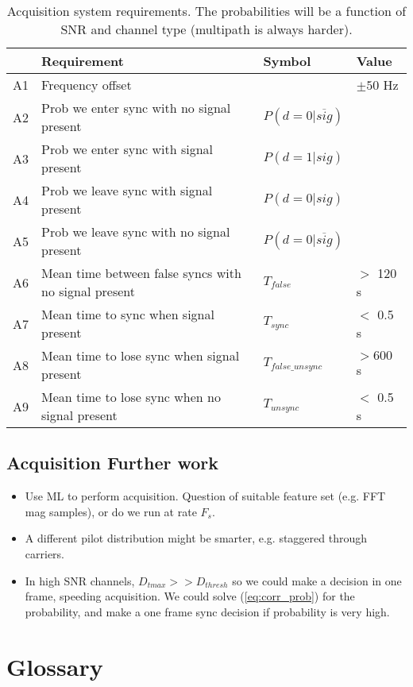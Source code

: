 \documentclass{article}
\begin{document}
\begin{table} [H]
\centering
\begin{tabular}{ m{0.3cm} | m{6.5cm} | m{2.1cm} | m{1.25cm}}
 \hline
  & Requirement & Symbol & Value \\
 \hline
  A1 & Frequency offset & & $\pm 50$ Hz \\
  A2 & Prob we enter sync with no signal present  & $P(d=0 | \overline{sig})$ & \\
  A3 & Prob we enter sync with signal present  & $P(d=1 | sig)$ &  \\
  A4 & Prob we leave sync with signal present  & $P(d=0 | sig)$ &  \\
  A5 & Prob we leave sync with no signal present  & $P(d=0 | \overline{sig})$ &  \\
  A6 & Mean time between false syncs with no signal present & $T_{false}$ & $>$ 120 s\\
  A7 & Mean time to sync when signal present & $T_{sync}$ & $<$ 0.5 s \\
  A8 & Mean time to lose sync when signal present & $T_{false\_unsync}$ & $>600$ s\\
  A9 & Mean time to lose sync when no signal present & $T_{unsync}$ & $<$ 0.5 s \\
 \hline
\end{tabular}
\caption{Acquisition system requirements. The probabilities will be a function of SNR and channel type (multipath is always harder).}
\label{tab:acq_req}
\end{table}

\subsection{Acquisition Further work}

\begin{itemize}
\item Use ML to perform acquisition.  Question of suitable feature set (e.g. FFT mag samples), or do we run at rate $F_s$.
\item A different pilot distribution might be smarter, e.g. staggered through carriers.
\item In high SNR channels, $D_{tmax}>>D_{thresh}$ so we could make a decision in one frame, speeding acquisition.  We could solve (\ref{eq:corr_prob}) for the probability, and make a one frame sync decision if probability is very high.
\end{itemize}

\section{Glossary}
\end{document}
